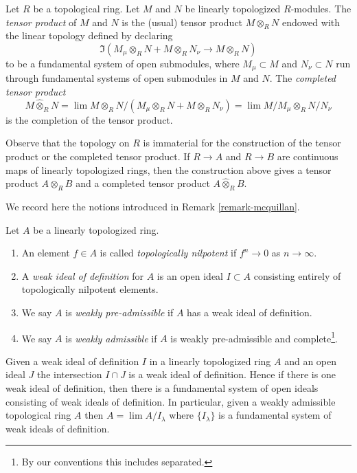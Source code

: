 \begin{definition}
\label{definition-toplogy-tensor-product}
Let $R$ be a topological ring. Let $M$ and $N$ be linearly
topologized $R$-modules. The {\it tensor product} of $M$ and $N$
is the (usual) tensor product $M \otimes_R N$ endowed
with the linear topology defined by declaring
$$
\Im(M_\mu \otimes_R N + M \otimes_R N_\nu \longrightarrow M \otimes_R N)
$$
to be a fundamental system of open submodules, where
$M_\mu \subset M$ and $N_\nu \subset N$ run through fundamental
systems of open submodules in $M$ and $N$.
The {\it completed tensor product}
$$
M \widehat{\otimes}_R N =
\lim M \otimes_R N/(M_\mu \otimes_R N + M \otimes_R N_\nu) =
\lim M/M_\mu \otimes_R N/N_\nu
$$
is the completion of the tensor product.
\end{definition}

\noindent
Observe that the topology on $R$ is immaterial for the construction
of the tensor product or the completed tensor product.
If $R \to A$ and $R \to B$ are continuous maps of
linearly topologized rings, then the construction above
gives a tensor product $A \otimes_R B$ and a completed
tensor product $A \widehat{\otimes}_R B$.

\medskip\noindent
We record here the notions introduced in Remark \ref{remark-mcquillan}.

\begin{definition}
\label{definition-weakly-admissible}
Let $A$ be a linearly topologized ring.
\begin{enumerate}
\item An element $f \in A$ is called {\it topologically nilpotent}
if $f^n \to 0$ as $n \to \infty$.
\item A {\it weak ideal of definition} for $A$ is an open ideal
$I \subset A$ consisting entirely of topologically nilpotent elements.
\item We say $A$ is {\it weakly pre-admissible} if $A$ has a weak
ideal of definition.
\item We say $A$ is {\it weakly admissible} if $A$ is weakly pre-admissible
and complete\footnote{By our conventions this includes separated.}.
\end{enumerate}
\end{definition}

\noindent
Given a weak ideal of definition $I$ in a linearly topologized ring
$A$ and an open ideal $J$ the intersection $I \cap J$ is a
weak ideal of definition. Hence if there is one weak ideal of definition,
then there is a fundamental system of open ideals
consisting of weak ideals of definition. In particular,
given a weakly admissible topological ring $A$ then
$A = \lim A/I_\lambda$ where $\{I_\lambda\}$ is a fundamental system
of weak ideals of definition.

